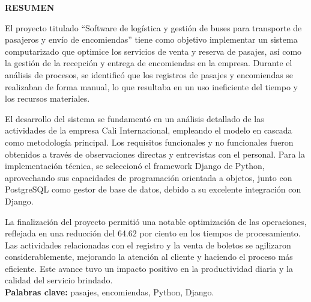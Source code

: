 \begin{center}
	\vspace*{-1cm} %
	\textbf{\Large RESUMEN} %
\end{center}

El proyecto titulado “Software de logística y gestión de buses para transporte de pasajeros y envío de encomiendas” tiene como objetivo implementar un sistema computarizado que optimice los servicios de venta y reserva de pasajes, así como la gestión de la recepción y entrega de encomiendas en la empresa. Durante el análisis de procesos, se identificó que los registros de pasajes y encomiendas se realizaban de forma manual, lo que resultaba en un uso ineficiente del tiempo y los recursos materiales.

El desarrollo del sistema se fundamentó en un análisis detallado de las actividades de la empresa Cali Internacional, empleando el modelo en cascada como metodología principal. Los requisitos funcionales y no funcionales fueron obtenidos a través de observaciones directas y entrevistas con el personal. Para la implementación técnica, se seleccionó el framework Django de Python, aprovechando sus capacidades de programación orientada a objetos, junto con PostgreSQL como gestor de base de datos, debido a su excelente integración con Django.

La finalización del proyecto permitió una notable optimización de las operaciones, reflejada en una reducción del 64.62 por ciento en los tiempos de procesamiento. Las actividades relacionadas con el registro y la venta de boletos se agilizaron considerablemente, mejorando la atención al cliente y haciendo el proceso más eficiente. Este avance tuvo un impacto positivo en la productividad diaria y la calidad del servicio brindado.\\
\textbf{Palabras clave:} pasajes, encomiendas, Python, Django.